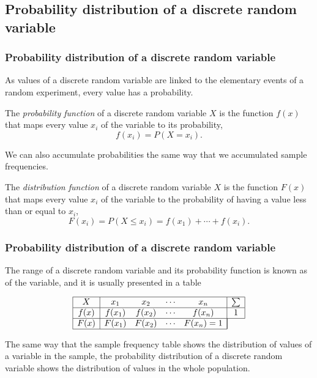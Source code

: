 \subsection{Probability distribution of a discrete random variable}

\begin{frame}
\frametitle{Probability distribution of a discrete random variable}
As values of a discrete random variable are linked to the elementary events of a random experiment, every value has a probability. 
\begin{definition}
The \emph{probability function} of a discrete random variable $X$ is the function $f(x)$ that maps every value $x_i$ of the variable to its probability,
\[
f(x_i) = P(X=x_i).
\]
\end{definition}

We can also accumulate probabilities the same way that we accumulated sample frequencies. 

\begin{definition}
The \emph{distribution function} of a discrete random variable $X$ is the function $F(x)$ that maps every value $x_i$ of the variable to the probability of having a value less than or equal to $x_i$,
\[
F(x_i) = P(X\leq x_i) = f(x_1)+\cdots +f(x_i).
\]
\end{definition}
\end{frame}


\begin{frame}
\frametitle{Probability distribution of a discrete random variable}
The range of a discrete random variable and its probability function is known as  of the variable, and it is usually presented in a table 

\[
\begin{array}{|c|cccc|c|}
\hline
X & x_1 & x_2 & \cdots & x_n & \sum\\ \hline
f(x) & f(x_1) & f(x_2) & \cdots & f(x_n) & 1\\
\hline
F(x) & F(x_1) & F(x_2) & \cdots & F(x_n) =1 &\multicolumn{1}{|c}{} \\
\cline{1-5}
\end{array}
\]

The same way that the sample frequency table shows the distribution of values of a variable in the sample, the probability distribution of a discrete random variable shows the distribution of values in the whole population. 
\end{frame}


